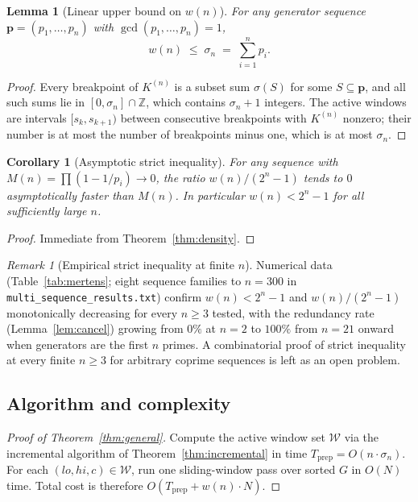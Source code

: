 \documentclass[11pt,a4paper]{amsart}
\theoremstyle{plain}
\newtheorem{lemma}[theorem]{Lemma}
\newtheorem{corollary}[theorem]{Corollary}
\theoremstyle{definition}
\theoremstyle{remark}
\newtheorem{remark}[theorem]{Remark}
\begin{document}
\begin{lemma}[Linear upper bound on $w(n)$]
\label{lem:w-le-sigma}
For any generator sequence $\mathbf{p} = (p_1,\ldots,p_n)$ with
$\gcd(p_1,\ldots,p_n) = 1$,
\[
  w(n) \;\leq\; \sigma_n \;=\; \sum_{i=1}^n p_i.
\]
\end{lemma}

\begin{proof}
Every breakpoint of $K^{(n)}$ is a subset sum $\sigma(S)$ for some
$S \subseteq \mathbf{p}$, and all such sums lie in $[0, \sigma_n] \cap \mathbb{Z}$,
which contains $\sigma_n + 1$ integers. The active windows are intervals
$[s_k, s_{k+1})$ between consecutive breakpoints with $K^{(n)}$ nonzero;
their number is at most the number of breakpoints minus one, which is at
most $\sigma_n$.
\end{proof}

\begin{corollary}[Asymptotic strict inequality]
\label{cor:subexp-asymp}
For any sequence with $M(n) = \prod (1 - 1/p_i) \to 0$, the ratio
$w(n)/(2^n - 1)$ tends to $0$ asymptotically faster than $M(n)$. In
particular $w(n) < 2^n - 1$ for all sufficiently large $n$.
\end{corollary}

\begin{proof}
Immediate from Theorem~\ref{thm:density}.
\end{proof}

\begin{remark}[Empirical strict inequality at finite $n$]
\label{rmk:subexp-empirical}
Numerical data (Table~\ref{tab:mertens}; eight sequence families to $n=300$
in \texttt{multi\_sequence\_results.txt}) confirm $w(n) < 2^n - 1$ and
$w(n)/(2^n-1)$ monotonically decreasing for every $n \geq 3$ tested,
with the redundancy rate (Lemma~\ref{lem:cancel}) growing from $0\%$
at $n=2$ to $100\%$ from $n = 21$ onward when generators are the first $n$
primes. A combinatorial proof of strict inequality at every finite $n \geq 3$
for arbitrary coprime sequences is left as an open problem.
\end{remark}

\subsection{Algorithm and complexity}

\begin{proof}[Proof of Theorem~\ref{thm:general}]
Compute the active window set $\mathcal{W}$ via the incremental algorithm
of Theorem~\ref{thm:incremental} in time $T_{\mathrm{prep}} = O(n \cdot \sigma_n)$.
For each $(lo, hi, c) \in \mathcal{W}$, run one sliding-window pass
over sorted $G$ in $O(N)$ time. Total cost is therefore
$O(T_{\mathrm{prep}} + w(n) \cdot N)$.
\end{proof}
\end{document}
